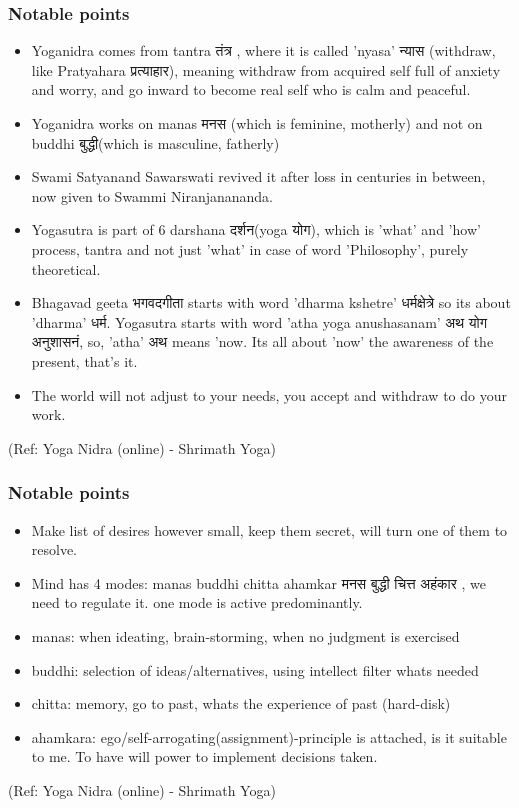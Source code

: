 \begin{frame}[fragile]\frametitle{Notable points}
    \begin{itemize}
        \item Yoganidra comes from tantra तंत्र  , where it is called 'nyasa' न्यास (withdraw, like Pratyahara प्रत्याहार), meaning withdraw from acquired self full of anxiety and worry, and go inward to become real self who is calm and peaceful.
		\item Yoganidra works on manas मनस  (which is feminine, motherly) and not on buddhi बुद्धी(which is masculine, fatherly)
		\item Swami Satyanand Sawarswati revived it after loss in centuries in between, now given to Swammi Niranjanananda.
		\item Yogasutra is part of 6 darshana दर्शन(yoga योग), which is 'what' and 'how' process, tantra and not just 'what' in case of word 'Philosophy', purely theoretical.
		\item Bhagavad geeta भगवदगीता  starts with word 'dharma kshetre' धर्मक्षेत्रे   so its about 'dharma' धर्म.    Yogasutra starts with word 'atha yoga anushasanam' अथ  योग अनुशासनं, so, 'atha' अथ means 'now. Its all about 'now' the awareness of the present, that's it.
		\item The world will not adjust to your needs, you accept and withdraw to do your work.
    \end{itemize}
	
	{\tiny (Ref: Yoga Nidra (online) - Shrimath Yoga)}

\end{frame}

\begin{frame}[fragile]\frametitle{Notable points}
    \begin{itemize}
        \item Make list of desires however small, keep them secret, will turn one of them to resolve.
		\item Mind has 4 modes: manas buddhi chitta ahamkar मनस बुद्धी चित्त अहंकार , we need to regulate it. one mode is active predominantly.
		\item manas: when ideating, brain-storming, when no judgment is exercised
		\item buddhi: selection of ideas/alternatives, using intellect filter whats needed
		\item chitta: memory, go to past, whats the experience of past (hard-disk)
		\item ahamkara: ego/self-arrogating(assignment)-principle is attached, is it suitable to me. To have will power to implement decisions taken.
    \end{itemize}
	
	{\tiny (Ref: Yoga Nidra (online) - Shrimath Yoga)}

\end{frame}


